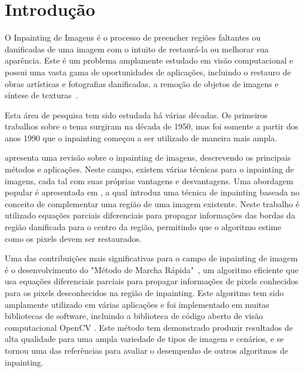 
\section{Introdução} \label{introduction}
O Inpainting de Imagens é o processo de preencher regiões faltantes ou danificadas de uma imagem com o intuito de restaurá-la ou melhorar sua aparência. Este é um problema amplamente estudado em visão computacional e possui uma vasta gama de oportunidades de aplicações, incluindo o restauro de obras artísticas e fotografias danificadas, a remoção de objetos de imagens e síntese de texturas~\cite{criminisi2004region}.

Esta área de pesquisa tem sido estudada há várias décadas. Os primeiros trabalhos sobre o tema surgiram na década de 1950, mas foi somente a partir dos anos 1990 que o inpainting começou a ser utilizado de maneira mais ampla.

\cite{Elharrouss2019} apresenta uma revisão sobre o inpainting de imagens, descrevendo os principais métodos e aplicações. Neste campo, existem várias técnicas para o inpainting de imagens, cada tal com suas próprias vantagens e desvantagens. Uma abordagem popular é apresentada em \cite{Bertalmio2000}, a qual introduz uma técnica de inpainting baseada no conceito de complementar uma região de uma imagem existente. Neste trabalho é utilizado equações parciais diferenciais para propagar informações das bordas da região danificada para o centro da região, permitindo que o algoritmo estime como os pixels devem ser restaurados.

Uma das contribuições mais significativas para o campo de inpainting de imagem é o desenvolvimento do "Método de Marcha Rápida"~\cite{Telea2004}, um algoritmo eficiente que usa equações diferenciais parciais para propagar informações de pixels conhecidos para os pixels desconhecidos na região de inpainting. Este algoritmo tem sido amplamente utilizado em várias aplicações e foi implementado em muitas bibliotecas de software, incluindo a biblioteca de código aberto de visão computacional OpenCV \cite{OpenCV}. Este método tem demonstrado produzir resultados de alta qualidade para uma ampla variedade de tipos de imagem e cenários, e se tornou uma das referências para avaliar o desempenho de outros algoritmos de inpainting.

